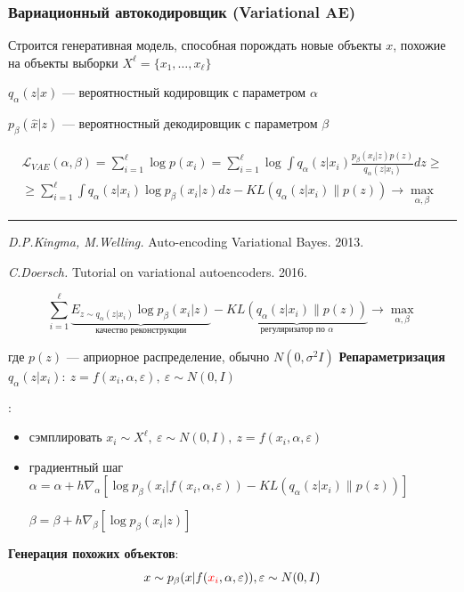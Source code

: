 \documentclass[fullscreen=true, bookmarks=true, hyperref={pdfencoding=unicode}]{beamer}
\begin{document}
\begin{frame}
  \frametitle{Вариационный автокодировщик (Variational AE)}

  Строится генеративная модель, способная порождать новые объекты $x$, похожие на объекты выборки $X^\ell = \{x_1,\dots,x_\ell \}$

  $q_\alpha(z|x)$ — вероятностный кодировщик с параметром $\alpha$

  $p_\beta(\hat x|z)$ — вероятностный декодировщик с параметром $\beta$

  \begin{align*}
    \mathscr{L}_{VAE}(\alpha, \beta) = \sum\limits_{i=1}^\ell \log p(x_i) = \sum\limits_{i=1}^\ell \log \int q_{\alpha} (z | x_i) \frac{p_{\beta}(x_i|z) p(z)}{q_{\alpha} (z | x_i)} dz \geq \\
    \geq \sum\limits_{i=1}^\ell \int q_\alpha(z|x_i) \log p_\beta(x_i|z)dz - KL(q_\alpha(z|x_i)\| p(z)) \to \max\limits_{\alpha, \beta}
  \end{align*}

  \noindent\rule{8cm}{0.4pt}

  {\small
  {\it D.P.Kingma, M.Welling.} Auto-encoding Variational Bayes. 2013.

  {\it C.Doersch.} Tutorial on variational autoencoders. 2016.}
\end{frame}


\begin{frame}

$$ \sum\limits_{i=1}^\ell \underbrace{E_{z \sim q_{\alpha}(z|x_i)} \log p_\beta(x_i|z)}_{\text{качество реконструкции}} -
\underbrace{KL(q_\alpha(z|x_i)\| p(z))}_{
  \text{регуляризатор по } \alpha
}
\to \max\limits_{\alpha, \beta}$$

где $p(z)$ — априорное распределение, обычно $N(0, \sigma^2 I)$
\pause
\vspace{0.5cm}
{\bf Репараметризация} $q_\alpha (z|x_i):\ z = f(x_i, \alpha, \varepsilon),\ \varepsilon \sim N(0, I)$

\vspace{0.5cm}{\bf Метод стохастического градиента}:
\begin{itemize}
  \item сэмплировать $x_i \sim X^\ell,\ \varepsilon \sim N(0, I),\ z = f(x_i, \alpha, \varepsilon)$
  \item градиентный шаг
  $ \alpha = \alpha + h \nabla_\alpha[\log p_\beta(x_i|f(x_i, \alpha, \varepsilon)) - KL(q_\alpha(z|x_i)\| p(z))] $

  $ \beta = \beta + h \nabla_\beta[\log p_\beta(x_i|z)] $
\end{itemize}


\vspace{0.5cm}
{\bf Генерация похожих объектов}: $$x \sim p_\beta(x|f({\color{red}x_i}, \alpha, \varepsilon)), \varepsilon \sim N(0, I)$$
\end{frame}
\end{document}

